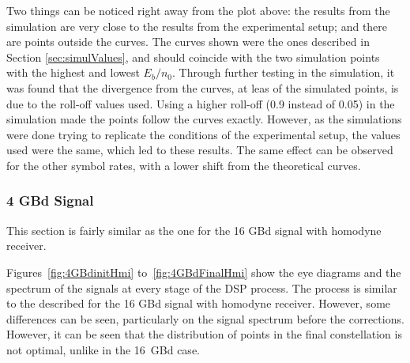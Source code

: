 	Two things can be noticed right away from the plot above: the results from the
	simulation are very close to the results from the experimental setup; and
	there are points outside the curves.
	The curves shown were the ones described in Section \ref{sec:simulValues},
	and should coincide with the two simulation points with the highest and lowest $E_b/n_0$.
	Through further testing in the simulation, it was found that the divergence
	from the curves, at leas of the simulated points, is due to the roll-off
	values used. Using a higher roll-off (0.9 instead of 0.05) in the simulation
	made the points follow the curves exactly. However, as the simulations were done
	trying to replicate the conditions of the experimental setup, the values used
	were the same, which led to these results. The same effect can be observed for
	the other symbol rates, with a lower shift from the theoretical curves.

	\subsubsection{4 GBd Signal}


	This section is fairly similar as the one for the 16 GBd signal with homodyne
	receiver.


	Figures~\ref{fig:4GBdinitHmi} to~\ref{fig:4GBdFinalHmi} show the eye diagrams
	and the spectrum of the signals at every stage of the DSP process. The process
	is similar to the described for the 16 GBd signal with homodyne receiver.
	However, some differences can be seen, particularly on the signal spectrum
	before the corrections. However, it can be seen that the distribution of
	points in the final constellation is not optimal, unlike in the 16~GBd case.


